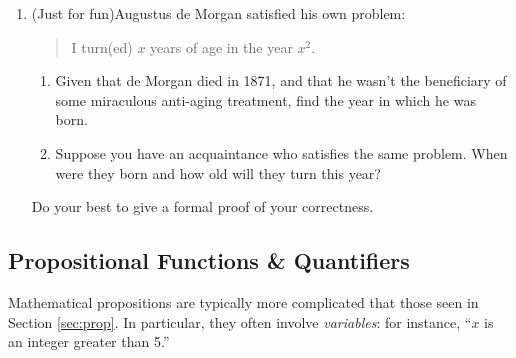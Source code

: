 \begin{exercises}{}{}
\begin{enumerate}
  
  
	  \item (Just for fun)\lstsp Augustus de Morgan satisfied his own problem:
		\begin{quote}
			I turn(ed) $x$ years of age in the year $x^2$.
		\end{quote}
		\begin{enumerate}
		  \item Given that de Morgan died in 1871, and that he wasn't the beneficiary of some miraculous anti-aging treatment, find the year in which he was born.
		  
		  \item Suppose you have an acquaintance who satisfies the same problem. When were they born and how old will they turn this year?
		\end{enumerate}
		Do your best to give a formal proof of your correctness.
  
	\end{enumerate}

\end{exercises}

\clearpage




\subsection{Propositional Functions \& Quantifiers}\label{sec:quant}

Mathematical propositions are typically more complicated that those seen in Section \ref{sec:prop}. In particular, they often involve \emph{variables}: for instance, ``$x$ is an integer greater than 5.''

